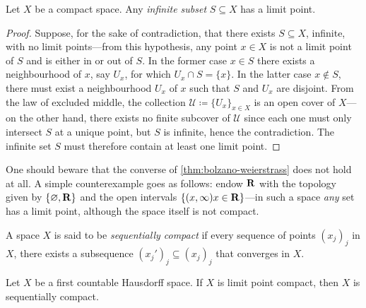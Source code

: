 \begin{theorem}
    \label{thm:bolzano-weierstrass}
    Let \(X\) be a compact space. Any \emph{infinite subset} \(S \subseteq X\) has a
    limit point.
\end{theorem}

\begin{proof}
    Suppose, for the sake of contradiction, that there exists \(S \subseteq X\),
    infinite, with no limit points---from this hypothesis, any point \(x \in X\)
    is not a limit point of \(S\) and is either in or out of \(S\). In the former
    case \(x \in S\) there exists a neighbourhood of \(x\), say \(U_x\), for which
    \(U_x \cap S = \{x\}\). In the latter case \(x \notin S\), there must exist a
    neighbourhood \(U_x\) of \(x\) such that \(S\) and \(U_x\) are disjoint. From
    the law of excluded middle, the collection
    \(\mathcal{U} \coloneq \{U_x\}_{x \in X}\) is an open cover of \(X\)---on the
    other hand, there exists no finite subcover of \(\mathcal{U}\) since each one
    must only intersect \(S\) at a unique point, but \(S\) is infinite, hence the
    contradiction. The infinite set \(S\) must therefore contain at least one limit
    point.
\end{proof}

\begin{remark}
    \label{rem:bolzano-weierstrass}
    One should beware that the converse of \cref{thm:bolzano-weierstrass} does not
    hold at all. A simple counterexample goes as follows: endow \(\mathbf{R}\) with the
    topology given by \(\{\varnothing, \mathbf{R}\}\) and the open intervals
    \(\{(x, \infty) \relax x \in \mathbf{R}\}\)---in such a space \emph{any} set has a
    limit point, although the space itself is not compact.
\end{remark}

\begin{definition}
    \label{def:sequentially-compact}
    A space \(X\) is said to be \emph{sequentially compact} if every
    sequence of points \((x_j)_j\) in \(X\), there exists a subsequence \((x_j')_j
    \subseteq (x_j)_j\) that converges in \(X\).
\end{definition}

\begin{lemma}
    \label{lem:fst-countable-hausdorff-limit-pt-implies-seq-comp}
    Let \(X\) be a first countable Hausdorff space. If \(X\) is limit point compact,
    then \(X\) is sequentially compact.
\end{lemma}


